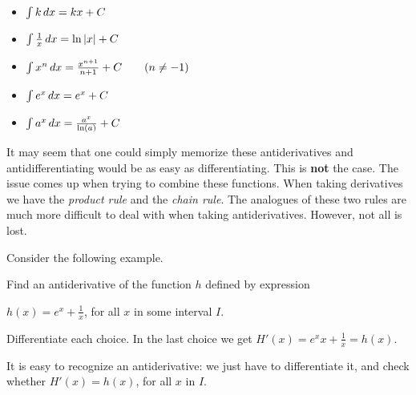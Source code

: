 \documentclass{ximera}
\begin{document}
\begin{theorem}\hfil
\begin{itemize}
\item $\int k \mathop{}\!d x= k x+C$
\item $\int \frac{1}{x} \mathop{}\!d x= \ln|x|+C$
\item $\int x^n \mathop{}\!d x= \frac{x^{n+1}}{n+1}+C\qquad(n\ne-1)$
\item $\int e^x \mathop{}\!d x= e^x + C$
\item $\int a^x \mathop{}\!d x= \frac{a^x}{\ln(a)}+C$
\end{itemize}
\end{theorem}


It may seem that one could simply memorize these antiderivatives and
antidifferentiating would be as easy as differentiating. This is
\textbf{not} the case. The issue comes up when trying to combine these
functions.  When taking derivatives we have the \textit{product rule}
and the \textit{chain rule}. The analogues of these two rules are much
more difficult to deal with when taking antiderivatives. However, not
all is lost.

Consider the following example.
\begin{example}
  Find  an antiderivative of the function $h$ defined by expression

   $h(x)=e^x+\frac{1}{x}$, for all $x$ in some interval $I$.
  \begin{multipleChoice}
  \end{multipleChoice}
  \begin{feedback}
    Differentiate each choice.  In the last choice we get
    $H'(x)=e^x{x}+\frac{1}{x}=h(x)$.
  \end{feedback}
\end{example}
It is easy to recognize an antiderivative: we just have to differentiate it, and check whether $H'(x)=h(x)$, for all $x$ in $I$.
\end{document}
